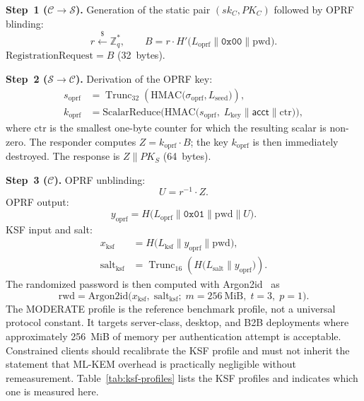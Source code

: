 \documentclass[preprint,12pt]{elsarticle}
\newcommand{\acct}{\mathsf{acct}}
\newcommand{\sigoprf}{\sigma_{\mathrm{oprf}}}
\newcommand{\Label}[1]{L_{\mathrm{#1}}}
\theoremstyle{remark}
\begin{document}
\textbf{Step~1 ($\mathcal{C} \to \mathcal{S}$).} Generation of the
static pair $(sk_C, PK_C)$ followed by OPRF blinding:
\begin{equation}
  r \xleftarrow{\$} \mathbb{Z}_q^*, \qquad
  B = r \cdot H'\!\bigl(\Label{oprf} \| \mathtt{0x00} \| \mathrm{pwd}\bigr).
  \label{eq:reg-blind}
\end{equation}
$\mathrm{RegistrationRequest} = B$ (32~bytes).

\textbf{Step~2 ($\mathcal{S} \to \mathcal{C}$).} Derivation of the OPRF
key:
\begin{align}
  s_{\mathrm{oprf}}
    &= \operatorname{Trunc}_{32}\!\left(
      \mathrm{HMAC}\!\bigl(\sigoprf, \Label{seed}\bigr)\right),
    \label{eq:oprf-seed}\\
  k_{\mathrm{oprf}}
    &= \mathrm{ScalarReduce}\!\bigl(
      \mathrm{HMAC}\!\bigl(
        s_{\mathrm{oprf}},\;
        \Label{key} \| \acct \| \mathrm{ctr}
      \bigr)\bigr),
    \label{eq:oprf-key}
\end{align}
where $\mathrm{ctr}$ is the smallest one-byte counter for which the resulting
scalar is non-zero. The responder computes
$Z = k_{\mathrm{oprf}} \cdot B$; the key $k_{\mathrm{oprf}}$ is then
immediately destroyed. The response is
$Z \| PK_S$ (64~bytes).

\textbf{Step~3 ($\mathcal{C}$).} OPRF unblinding:
\[
  U = r^{-1} \cdot Z.
\]
OPRF output:
\begin{equation}
  y_{\mathrm{oprf}} = H\!\bigl(\Label{oprf} \|
    \mathtt{0x01} \| \mathrm{pwd} \| U\bigr).
  \label{eq:oprf-output}
\end{equation}
KSF input and salt:
\begin{align}
  x_{\mathrm{ksf}}
    &= H\!\bigl(\Label{ksf} \|
      y_{\mathrm{oprf}} \| \mathrm{pwd}\bigr),\\
  \mathrm{salt}_{\mathrm{ksf}}
    &= \operatorname{Trunc}_{16}\!\left(
      H\!\bigl(\Label{salt} \| y_{\mathrm{oprf}}\bigr)\right).
\end{align}
The randomized password is then computed with Argon2id~\cite{biryukov2016}
as
\begin{equation}
  \mathrm{rwd} = \mathrm{Argon2id}\!\bigl(
    x_{\mathrm{ksf}},\; \mathrm{salt}_{\mathrm{ksf}};\;
    m = 256~\mathrm{MiB},\; t = 3,\; p = 1\bigr).
  \label{eq:rwd}
\end{equation}
The MODERATE profile is the reference benchmark profile, not a universal
protocol constant. It targets server-class, desktop, and B2B deployments
where approximately 256~MiB of memory per authentication attempt is
acceptable. Constrained clients should recalibrate the KSF profile and
must not inherit the statement that ML-KEM overhead is practically
negligible without remeasurement. Table~\ref{tab:ksf-profiles} lists the
KSF profiles and indicates which one is measured here.
\end{document}
